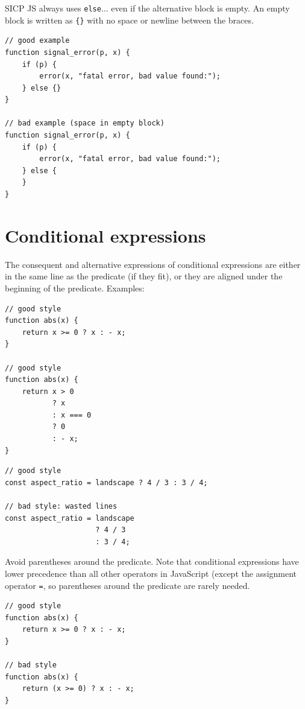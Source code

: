 SICP JS always uses \lstinline{else}... even if the alternative block
is empty. An empty block is written as \lstinline~{}~ with no space or newline
between the braces.

\begin{lstlisting}
// good example
function signal_error(p, x) {
    if (p) {
        error(x, "fatal error, bad value found:");
    } else {}
}

// bad example (space in empty block)
function signal_error(p, x) {
    if (p) {
        error(x, "fatal error, bad value found:");
    } else {
    }
}
\end{lstlisting}

\vspace{-4mm}

\section*{Conditional expressions}

The consequent and alternative expressions of conditional expressions
are either in the same line as the predicate (if they fit),
or they are aligned under the beginning of the predicate.
Examples:
\begin{lstlisting}
// good style
function abs(x) {
    return x >= 0 ? x : - x;
}

// good style
function abs(x) {
    return x > 0
           ? x
           : x === 0
           ? 0
           : - x;
}
\end{lstlisting}
\begin{lstlisting}
// good style
const aspect_ratio = landscape ? 4 / 3 : 3 / 4;

// bad style: wasted lines
const aspect_ratio = landscape
                     ? 4 / 3
                     : 3 / 4;
\end{lstlisting}

Avoid parentheses around the predicate. Note that conditional expressions have lower
precedence than all other operators in JavaScript (except the assignment operator
\lstinline{=}, so parentheses around the predicate are rarely needed.

\begin{lstlisting}
// good style
function abs(x) {
    return x >= 0 ? x : - x;
}

// bad style
function abs(x) {
    return (x >= 0) ? x : - x;
}
\end{lstlisting}

